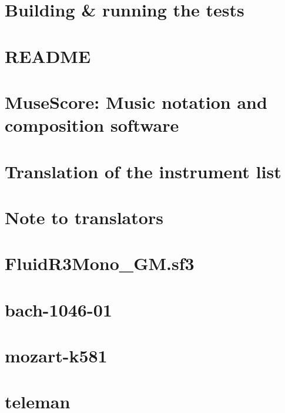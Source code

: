 \documentclass[twoside]{book}
\newcommand{\+}{\discretionary{\mbox{\scriptsize$\hookleftarrow$}}{}{}}
\begin{document}
\chapter{Building \& running the tests}
\label{md_mtest__r_e_a_d_m_e}

\chapter{R\+E\+A\+D\+ME}
\label{md_omr__r_e_a_d_m_e}

\chapter{Muse\+Score\+: Music notation and composition software}
\label{md__r_e_a_d_m_e}

\chapter{Translation of the instrument list}
\label{md_share_instruments__r_e_a_d_m_e}

\chapter{Note to translators}
\label{md_share_locale__r_e_a_d_m_e}

\chapter{Fluid\+R3\+Mono\+\_\+\+G\+M.\+sf3}
\label{md_share_sound__fluid_r3_mono__license}

\chapter{bach-\/1046-\/01}
\label{md_test_md_bach-1046-01}

\chapter{mozart-\/k581}
\label{md_test_md_mozart-k581}

\chapter{teleman}
\label{md_test_md_teleman}

\end{document}
